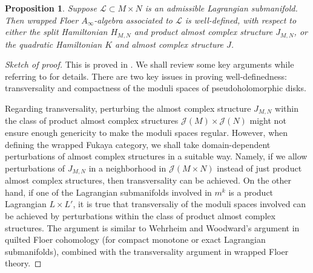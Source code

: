 \documentclass{amsart}
\newtheorem{proposition}[theorem]{Proposition}
\numberwithin{equation}{section}
\numberwithin{figure}{section}
\begin{document}
\begin{proposition}
	Suppose $\mathcal{L} \subset M \times N$ is an admissible Lagrangian submanifold. Then wrapped Floer $A_{\infty}$-algebra associated to $\mathcal{L}$ is well-defined, with respect to either the split Hamiltonian $H_{M, N}$ and product almost complex structure $J_{M, N}$, or the quadratic Hamiltonian $K$ and almost complex structure $J$.
\end{proposition}
\begin{proof}[Sketch of proof]
	This is proved in \cite{Gao1}. We shall review some key arguments while referring to \cite{Gao1} for details. There are two key issues in proving well-definedness: transversality and compactness of the moduli spaces of pseudoholomorphic disks. \par
	Regarding transversality, perturbing the almost complex structure $J_{M, N}$ within the class of product almost complex structures $\mathcal{J}(M) \times \mathcal{J}(N)$ might not ensure enough genericity to make the moduli spaces regular. However, when defining the wrapped Fukaya category, we shall take domain-dependent perturbations of almost complex structures in a suitable way. Namely, if we allow perturbations of $J_{M, N}$ in a neighborhood in $\mathcal{J}(M \times N)$ instead of just product almost complex structures, then transversality can be achieved. On the other hand, if one of the Lagrangian submanifolds involved in $m^{k}$ is a product Lagrangian $L \times L'$, it is true that transversaliy of the moduli spaces involved can be achieved by perturbations within the class of product almost complex structures. The argument is similar to Wehrheim and Woodward's argument in quilted Floer cohomology (for compact monotone or exact Lagrangian submanifolds), combined with the transversality argument in wrapped Floer theory. \par

\end{proof}
\end{document}
